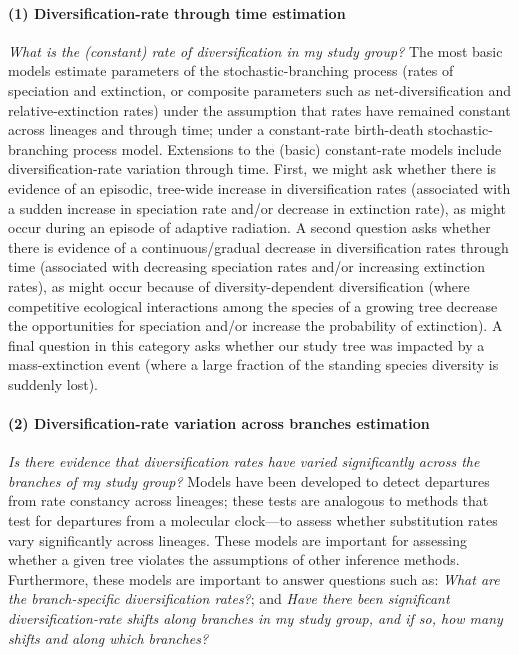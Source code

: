 \paragraph{(1) Diversification-rate through time estimation}\textit{What is the (constant) rate of diversification in my study group?} 
The most basic models estimate parameters of the stochastic-branching process (\IE rates of speciation and extinction, or composite parameters such as net-diversification and relative-extinction rates) under the assumption that rates have remained constant across lineages and through time; \IE under a constant-rate birth-death stochastic-branching process model.
Extensions to the (basic) constant-rate models include diversification-rate variation through time.
First, we might ask whether there is evidence of an episodic, tree-wide increase in diversification rates (associated with a sudden increase in speciation rate and/or decrease in extinction rate), as might occur during an episode of adaptive radiation.
A second question asks whether there is evidence of a continuous/gradual decrease in diversification rates through time (associated with decreasing speciation rates and/or increasing extinction rates), as might occur because of diversity-dependent diversification (\IE where competitive ecological interactions among the species of a growing tree decrease the opportunities for speciation and/or increase the probability of extinction).
A final question in this category asks whether our study tree was impacted by a mass-extinction event (where a large fraction of the standing species diversity is suddenly lost).



\paragraph{(2) Diversification-rate variation across branches estimation}\textit{Is there evidence that diversification rates have varied significantly across the branches of my study group?}
Models have been developed to detect departures from rate constancy across lineages; these tests are analogous to methods that test for departures from a molecular clock---\IE to assess whether substitution rates vary significantly across lineages.
These models are important for assessing whether a given tree violates the assumptions of other inference methods.
Furthermore, these models are important to answer questions such as:
\textit{What are the branch-specific diversification rates?}; and
\textit{Have there been significant diversification-rate shifts along branches in my study group, and if so, how many shifts and along which branches?}


